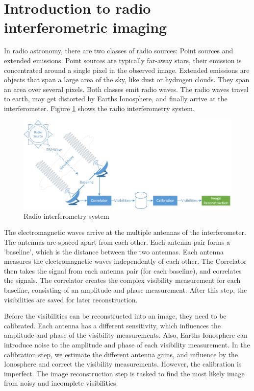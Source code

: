 \section{Introduction to radio interferometric imaging}\label{radio}
In radio astronomy, there are two classes of radio sources: Point sources and extended emissions. Point sources are typically far-away stars, their emission is concentrated around a single pixel in the observed image. Extended emissions are objects that span a large area of the sky, like dust or hydrogen clouds. They span an area over several pixels. Both classes emit radio waves. The radio waves travel to earth, may get distorted by Earths Ionosphere, and finally arrive at the interferometer. Figure \ref{intro:system} shows the radio interferometry system.

\begin{figure}[h]
	\centering
	\includegraphics[width=0.80\linewidth]{./chapters/01.intro/system.png}
	\caption{Radio interferometry system}
	\label{intro:system}
\end{figure}

The electromagnetic waves arrive at the multiple antennas of the interferometer. The antennas are spaced apart from each other. Each antenna pair forms a 'baseline', which is the distance between the two antennas. Each antenna measures the electromagnetic waves independently of each other. The Correlator then takes the signal from each antenna pair (for each baseline), and correlates the signals. The correlator creates the complex visibility measurement for each baseline, consisting of an amplitude and phase measurement. After this step, the visibilities are saved for later reconstruction.

Before the visibilities can be reconstructed into an image, they need to be calibrated. Each antenna has a different sensitivity, which influences the amplitude and phase of the visibility measurements. Also, Earths Ionosphere can introduce noise to the amplitude and phase of each visibility measurement. In the calibration step, we estimate the different antenna gains, and influence by the Ionosphere and correct the visibility measurements. However, the calibration is imperfect. The image reconstruction step is tasked to find the most likely image from noisy and incomplete visibilities.

